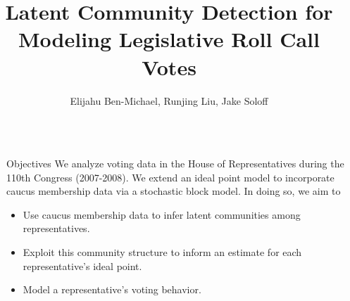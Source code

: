 \documentclass[final]{beamer}
\title{Latent Community Detection for Modeling Legislative Roll Call Votes} %
\author{Elijahu Ben-Michael, Runjing Liu, Jake Soloff } %
\institute{Department of Statistics, UC Berkeley} %
\newlength{\sepwid}
\newlength{\onecolwid}
\begin{document}

\setlength{\belowcaptionskip}{2ex} %
\setlength\belowdisplayshortskip{2ex} %

\begin{frame}[t] %



\begin{columns}[t] %

\begin{column}{\sepwid}\end{column} %

\begin{column}{\onecolwid} %




\begin{alertblock}{Objectives}
We analyze voting data in the House of Representatives during the 110th Congress (2007-2008). We extend an ideal point model to incorporate caucus membership data via a stochastic block model. In doing so, we aim to 
\begin{itemize}
\item Use caucus membership data to infer latent communities among representatives.
\item Exploit this community structure to inform an estimate for each representative's ideal point.
\item Model a representative's voting behavior.
\end{itemize}

\end{alertblock}



\end{column}
\end{columns}
\end{frame}
\end{document}
